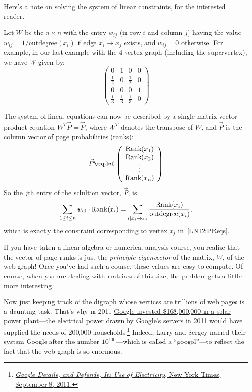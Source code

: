 \begin{editingnotes}
Here's a note on solving the system of linear constraints, for the
interested reader.

Let $W$ be the $n \times n$ with the entry $w_{ij}$ (in row $i$ and
column $j$) having the value $w_{ij} = 1/\text{outdegree}(x_i)$ if edge
$x_i \rightarrow x_j$ exists, and $w_{ij} = 0$ otherwise.  For example, in
our last example with the 4-vertex graph (including the supervertex), we have
$W$ given by:
\[
\left( \begin{array}{cccc}
    0 & 1 & 0 & 0 \\
    \frac{1}{2} & 0 & \frac{1}{2} & 0 \\
    0 & 0 & 0 & 1\\
    \frac{1}{3} & \frac{1}{3} & \frac{1}{3} & 0 \end{array} \right)
\]

The system of linear equations can now be described by a single matrix
vector product equation $W^T \vec{P} = \vec{P}$, where $W^T$ denotes the
transpose of $W$, and $\vec{P}$ is the column vector of page probabilities
(ranks):
\[\vec{P}\eqdef
\left( \begin{array}{c}
    \PRnk(x_1) \\
    \PRnk(x_2) \\
    \vdots \\
    \PRnk(x_n) \end{array} \right)
\]
So the $j$th entry of the solultion vector, $\vec{P}$, is
\[
\sum_{1\leq i \leq n} w_{ij} \cdot \operatorname{Rank}(x_i) =
\sum_{i \mid x_i \rightarrow x_j} \frac{\operatorname{Rank}(x_i)}{\text{outdegree}(x_i)},
\]
which is exactly the constraint corresponding to vertex $x_j$
in~\eqref{LN12:PReqs}.

If you have taken a linear algebra or numerical analysis course, you
realize that the vector of page ranks is just the \emph{principle
  eigenvector} of the matrix, $W$, of the web graph!  Once you've had such
a course, these values are easy to compute.  Of course, when you are
dealing with matrices of this size, the problem gets a little more
interesting.

\end{editingnotes}

Now just keeping track of the digraph whose vertices are trillions of
web pages is a daunting task.  That's why in 2011
\href{http://phys.org/news/2011-04-google-invests-million-solar-power.html}{Google
  invested \$168,000,000 in a solar power plant}---the electrical
power drawn by Google's servers in 2011 would have supplied the needs
of 200,000
households.\footnote{\href{http://www.nytimes.com/2011/09/09/technology/google-details-and-defends-its-use-of-electricity.html}
{\emph{Google Details, and Defends, Its Use of Electricity}, New York
  Times, September 8, 2011.}}  Indeed, Larry and Sergey named their
system Google after the number $10^{100}$---which is called a
``googol''---to reflect the fact that the web graph is so enormous.

